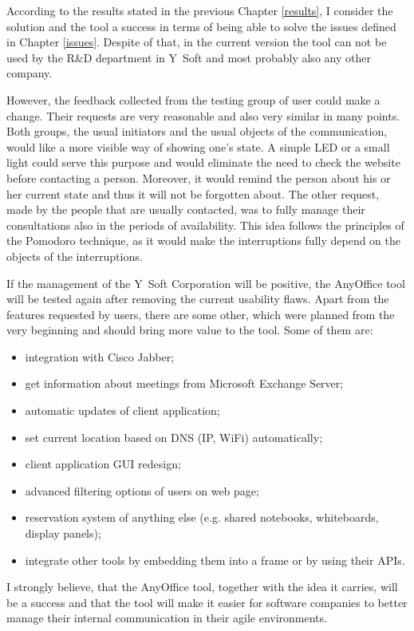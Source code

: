 \documentclass[11pt,singleside]{myfithesis2}
\begin{document}
According to the results stated in the previous Chapter \ref{results}, I consider the solution and the tool a success in terms of being able to solve the issues defined in Chapter \ref{issues}. Despite of that, in the current version the tool can not be used by the R\&D department in Y~Soft and most probably also any other company.

However, the feedback collected from the testing group of user could make a change. Their requests are very reasonable and also very similar in many points. Both groups, the usual initiators and the usual objects of the communication, would like a more visible way of showing one's state. A simple LED or a small light could serve this purpose and would eliminate the need to check the website before contacting a person. Moreover, it would remind the person about his or her current state and thus it will not be forgotten about. The other request, made by the people that are usually contacted, was to fully manage their consultations also in the periods of availability. This idea follows the principles of the Pomodoro technique, as it would make the interruptions fully depend on the objects of the interruptions.

If the management of the Y~Soft Corporation will be positive, the AnyOffice tool will be tested again after removing the current usability flaws. Apart from the features requested by users, there are some other, which were planned from the very beginning and should bring more value to the tool. Some of them are:
\begin{itemize}
	\item integration with Cisco Jabber;
	\item get information about meetings from Microsoft Exchange Server;
	\item automatic updates of client application;
	\item set current location based on DNS (IP, WiFi) automatically;
	\item client application GUI redesign;
	\item advanced filtering options of users on web page;
	\item reservation system of anything else (e.g. shared notebooks, whiteboards, display panels);
	\item integrate other tools by embedding them into a frame or by using their APIs.
\end{itemize}

I strongly believe, that the AnyOffice tool, together with the idea it carries, will be a success and that the tool will make it easier for software companies to better manage their internal communication in their agile environments.
\end{document}
